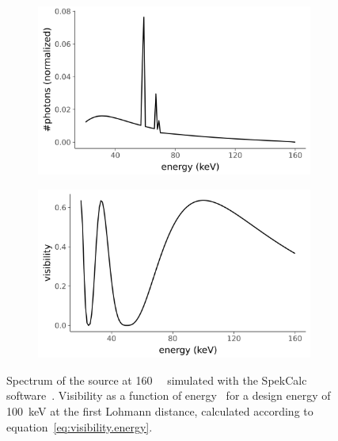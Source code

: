 \begin{figure}[htb]
    \centering
    \begin{subfigure}[b]{.75\textwidth}
    \centering
    \includegraphics[width=\textwidth]{gfx/spectrum-visibility/spectrum.png}
    \caption{}
    \label{fig:spectrum}
    \end{subfigure}
    \hfill
    \begin{subfigure}[b]{.75\textwidth}
    \centering
    \includegraphics[width=\textwidth]{gfx/spectrum-visibility/visibility.png}
    \caption{}
    \label{fig:visibility}
    \end{subfigure}
    \caption[Spectrum and theoretical visibility of the \SI{100}{\kilo\eV}
    interferometer.]{Spectrum of the source at \SI{160}{\kilo\voltpeak}
simulated with the SpekCalc software~\parencite{spekcalc}. Visibility as a
function of energy~\parencite{Thuering20130027} for a design energy of \SI{100}{\kilo\eV} at the first
Lohmann distance, calculated according to
equation~\ref{eq:visibility.energy}.}
    \label{fig:visibility.energy}
\end{figure}

